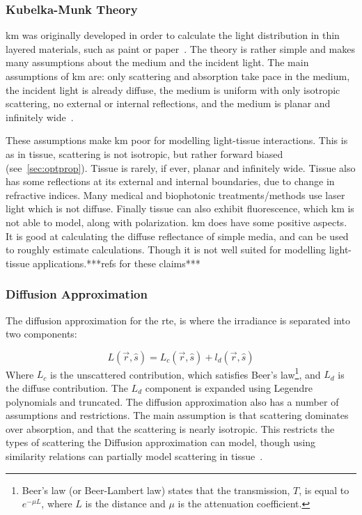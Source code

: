 \subsubsection*{Kubelka-Munk Theory}
\gls{km} was originally developed in order to calculate the light distribution in thin layered materials, such as paint or paper~\cite{barbaric2011kubelka}. The theory is rather simple and makes many assumptions about the medium and the incident light. The main assumptions of \gls{km} are: only scattering and absorption take pace in the medium, the incident light is already diffuse, the medium is uniform with only isotropic scattering, no external or internal reflections, and the medium is planar and infinitely wide~\cite{jasinski2011modelling,cheong1990review,gabriela2013mathematical}.

These assumptions make \gls{km} poor for modelling light-tissue interactions. This is as in tissue, scattering is not isotropic, but rather forward biased (see~\cref{sec:optprop}). Tissue is rarely, if ever, planar and infinitely wide. Tissue also has some reflections at its external and internal boundaries, due to change in refractive indices. Many medical and biophotonic treatments/methods use laser light which is not diffuse. Finally tissue can also exhibit fluorescence, which \gls{km} is not able to model, along with polarization. 
\Gls{km} does have some positive aspects. It is good at calculating the diffuse reflectance of simple media, and can be used to roughly estimate calculations. Though it is not well suited for modelling light-tissue applications.***refs for these claims***

\subsubsection*{Diffusion Approximation}
The diffusion approximation for the \gls{rte}, is where the irradiance is separated into two components:

\begin{equation}
	L(\vec{r},\hat{s}) = L_c(\vec{r},\hat{s}) +l_d(\vec{r},\hat{s})
\end{equation}
Where $L_c$ is the unscattered contribution, which satisfies Beer's law\footnote{Beer's law (or Beer-Lambert law) states that the transmission, $T$, is equal to $e^{-\mu L}$, where $L$ is the distance and $\mu$ is the attenuation coefficient.}, and $L_d$ is the diffuse contribution. The $L_d$ component is expanded using Legendre polynomials and truncated. 
The diffusion approximation also has a number of assumptions and restrictions. The main assumption is that scattering dominates over absorption, and that the scattering is nearly isotropic. This restricts the types of scattering the Diffusion approximation can model, though using similarity relations can partially model scattering in tissue~\cite{graaff1993similarity,yoon1989accuracies}.

